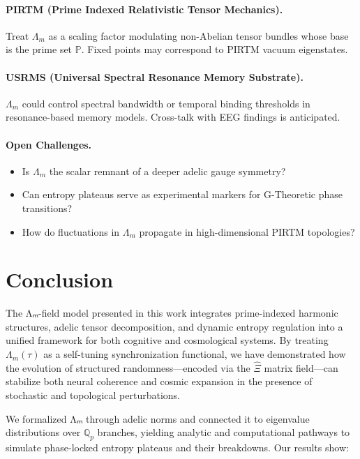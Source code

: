 \documentclass[12pt]{article}
\theoremstyle{plain}
\begin{document}
\paragraph{PIRTM (Prime Indexed Relativistic Tensor Mechanics).} 
Treat $\Lambda_m$ as a scaling factor modulating non-Abelian tensor bundles whose base is the prime set $\mathbb{P}$. Fixed points may correspond to PIRTM vacuum eigenstates.

\paragraph{USRMS (Universal Spectral Resonance Memory Substrate).} 
$\Lambda_m$ could control spectral bandwidth or temporal binding thresholds in resonance-based memory models. Cross-talk with EEG findings is anticipated.

\paragraph{Open Challenges.}
\begin{itemize}
    \item Is $\Lambda_m$ the scalar remnant of a deeper adelic gauge symmetry?
    \item Can entropy plateaus serve as experimental markers for G-Theoretic phase transitions?
    \item How do fluctuations in $\Lambda_m$ propagate in high-dimensional PIRTM topologies?
\end{itemize}

\section{Conclusion}

The Λₘ-field model presented in this work integrates prime-indexed harmonic structures, adelic tensor decomposition, and dynamic entropy regulation into a unified framework for both cognitive and cosmological systems. By treating $\Lambda_m(\tau)$ as a self-tuning synchronization functional, we have demonstrated how the evolution of structured randomness—encoded via the $\hat{\Xi}$ matrix field—can stabilize both neural coherence and cosmic expansion in the presence of stochastic and topological perturbations.

We formalized Λₘ through adelic norms and connected it to eigenvalue distributions over $\mathbb{Q}_p$ branches, yielding analytic and computational pathways to simulate phase-locked entropy plateaus and their breakdowns. Our results show:
\end{document}
